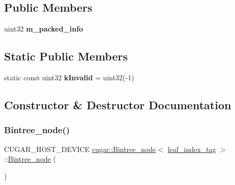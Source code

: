 \subsection*{Public Members}
\begin{DoxyCompactItemize}
\item 
\mbox{\label{structcugar_1_1_bintree__node_3_01leaf__index__tag_01_4_aa6f6668d2c9c79791e373dbf4d17edee}} 
uint32 {\bfseries m\+\_\+packed\+\_\+info}
\end{DoxyCompactItemize}
\subsection*{Static Public Members}
\begin{DoxyCompactItemize}
\item 
\mbox{\label{structcugar_1_1_bintree__node_3_01leaf__index__tag_01_4_a61a20899e0049655baebc85105f9b9f4}} 
static const uint32 {\bfseries k\+Invalid} = uint32(-\/1)
\end{DoxyCompactItemize}


\subsection{Constructor \& Destructor Documentation}
\mbox{\label{structcugar_1_1_bintree__node_3_01leaf__index__tag_01_4_a657e48abcb145d518e9bfd692fa66d96}} 
\subsubsection{\texorpdfstring{Bintree\+\_\+node()}{Bintree\_node()}\hspace{0.1cm}{\footnotesize\ttfamily [1/2]}}
{\footnotesize\ttfamily C\+U\+G\+A\+R\+\_\+\+H\+O\+S\+T\+\_\+\+D\+E\+V\+I\+CE \hyperlink{structcugar_1_1_bintree__node}{cugar\+::\+Bintree\+\_\+node}$<$ \hyperlink{structcugar_1_1leaf__index__tag}{leaf\+\_\+index\+\_\+tag} $>$\+::\hyperlink{structcugar_1_1_bintree__node}{Bintree\+\_\+node} (\begin{DoxyParamCaption}{ }\end{DoxyParamCaption})\hspace{0.3cm}{\ttfamily [inline]}}

